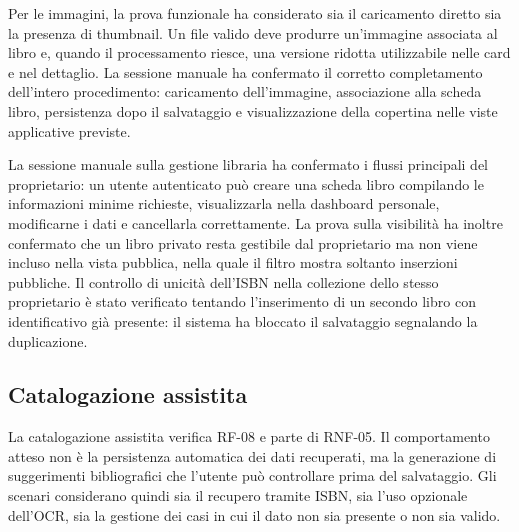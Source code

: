 Per le immagini, la prova funzionale ha considerato sia il caricamento diretto sia la presenza di thumbnail. Un file valido deve produrre un'immagine associata al libro e, quando il processamento riesce, una versione ridotta utilizzabile nelle card e nel dettaglio. La sessione manuale ha confermato il corretto completamento dell'intero procedimento: caricamento dell'immagine, associazione alla scheda libro, persistenza dopo il salvataggio e visualizzazione della copertina nelle viste applicative previste.

La sessione manuale sulla gestione libraria ha confermato i flussi principali del proprietario: un utente autenticato può creare una scheda libro compilando le informazioni minime richieste, visualizzarla nella dashboard personale, modificarne i dati e cancellarla correttamente. La prova sulla visibilità ha inoltre confermato che un libro privato resta gestibile dal proprietario ma non viene incluso nella vista pubblica, nella quale il filtro mostra soltanto inserzioni pubbliche. Il controllo di unicità dell'ISBN nella collezione dello stesso proprietario è stato verificato tentando l'inserimento di un secondo libro con identificativo già presente: il sistema ha bloccato il salvataggio segnalando la duplicazione.


\subsection{Catalogazione assistita}
\label{subsec:test-cataloging-assistita}

La catalogazione assistita verifica RF-08 e parte di RNF-05. Il comportamento atteso non è la persistenza automatica dei dati recuperati, ma la generazione di suggerimenti bibliografici che l'utente può controllare prima del salvataggio. Gli scenari considerano quindi sia il recupero tramite ISBN, sia l'uso opzionale dell'OCR, sia la gestione dei casi in cui il dato non sia presente o non sia valido.

